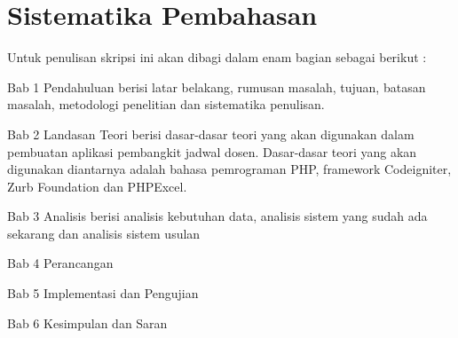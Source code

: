 
\section{Sistematika Pembahasan}
\label{sec:sispem}
Untuk penulisan skripsi ini akan dibagi dalam enam bagian sebagai berikut :

Bab 1 Pendahuluan berisi latar belakang, rumusan masalah, tujuan, batasan masalah,  metodologi penelitian dan sistematika penulisan.

Bab 2 Landasan Teori berisi dasar-dasar teori yang akan digunakan dalam pembuatan aplikasi pembangkit jadwal dosen. Dasar-dasar teori yang akan digunakan diantarnya adalah bahasa pemrograman PHP, framework Codeigniter, Zurb Foundation dan PHPExcel.

Bab 3 Analisis berisi analisis kebutuhan data, analisis sistem yang sudah ada sekarang dan analisis sistem usulan

Bab 4 Perancangan

Bab 5 Implementasi dan Pengujian

Bab 6 Kesimpulan dan Saran



